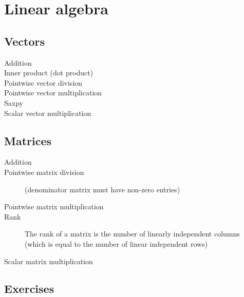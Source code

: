 \chapter{Linear algebra}

\section{Vectors}
\begin{description}
    \item[Addition]
    \item[Inner product (dot product)]
    \item[Pointwise vector division]
    \item[Pointwise vector multiplication]
    \item[Saxpy]
    \item[Scalar vector multiplication]
\end{description}

\section{Matrices}
\begin{description}
    \item[Addition]
    \item[Pointwise matrix division] (denominator matrix must have non-zero entries)
    \item[Pointwise matrix multiplication]
    \item[Rank] The rank of a matrix is the number of linearly independent columns (which is equal to the number of linear independent rows)
    \item[Scalar matrix multiplication]
\end{description}

\section{Exercises}
\begin{ExerciseList}
\end{ExerciseList}
